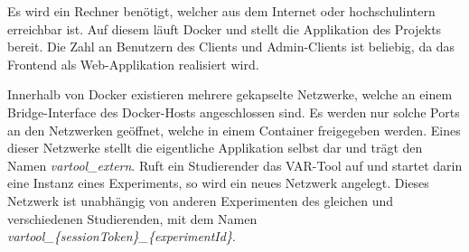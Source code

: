 Es wird ein Rechner benötigt, welcher aus dem Internet oder hochschulintern erreichbar ist.
  Auf diesem läuft Docker und stellt die Applikation des Projekts bereit.
  Die Zahl an Benutzern des Clients und Admin-Clients ist beliebig, da das Frontend als Web-Applikation realisiert wird.
  \par
  Innerhalb von Docker existieren mehrere gekapselte Netzwerke, welche an einem Bridge-Interface des Docker-Hosts angeschlossen sind.
  Es werden nur solche Ports an den Netzwerken geöffnet, welche in einem Container freigegeben werden.
  Eines dieser Netzwerke stellt die eigentliche Applikation selbst dar und trägt den Namen \textit{vartool\_extern}.
  Ruft ein Studierender das VAR-Tool auf und startet darin eine Instanz eines Experiments, so wird ein neues Netzwerk angelegt.
  Dieses Netzwerk ist unabhängig von anderen Experimenten des gleichen und verschiedenen Studierenden, mit dem Namen \textit{vartool\_\{sessionToken\}\_\{experimentId\}}. 


